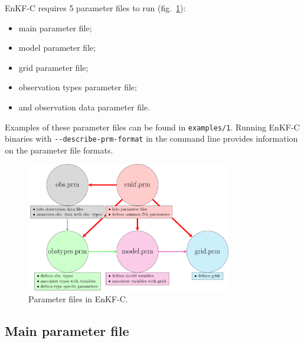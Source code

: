 \documentclass[11pt]{report}
\begin{document}
EnKF-C requires 5 parameter files to run (fig.~\ref{fig:prm}):
\begin{itemize} 
\item main parameter file;
\item model parameter file;
\item grid parameter file;
\item observation types parameter file;
\item and observation data parameter file.
\end{itemize}
Examples of these parameter files can be found in \verb|examples/1|.
Running EnKF-C binaries with \verb|--describe-prm-format| in the command line provides information on the parameter file formats.

\begin{figure}[h]
  \centering
  \includegraphics[width=0.8\textwidth]{plots/prm.pdf}
  \caption{Parameter files in EnKF-C.}
  \label{fig:prm}
\end{figure}

\subsection{Main parameter file}
\label{sec:mainprm}
\end{document}
